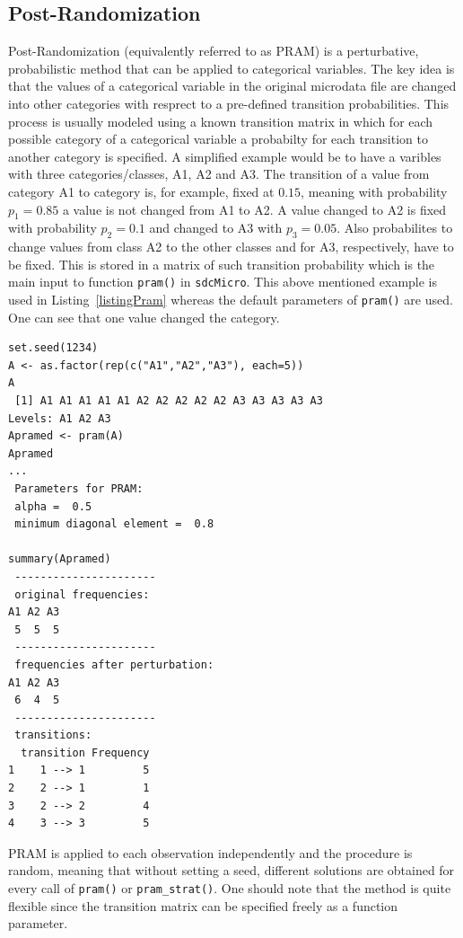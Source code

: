 \documentclass[12pt]{article}
\begin{document}
\subsection{Post-Randomization}\label{method:pram}
Post-Randomization (equivalently referred to as PRAM) \citep{Gouweleeuw98} is a perturbative, 
probabilistic method that can be applied to categorical variables. 
The key idea is that the values of a categorical variable 
in the original microdata file are changed into other categories with resprect to a pre-defined transition probabilities.
This process is usually modeled using a known transition matrix 
in which for each possible category of a categorical variable a probabilty for each transition to another category
 is specified. %
A simplified example would be to have a varibles with three categories/classes, A1, A2 and A3. 
The transition of 
a value from category A1 to category is, for example, fixed at $0.15$, meaning with
 probability $p_1=0.85$ a value is not changed from A1 to A2.
A value changed to A2 is fixed with probability $p_2=0.1$ and 
changed to A3 with $p_3=0.05$. 
Also probabilites to change values from class A2 to the other classes and for A3, respectively, have to be fixed.
This is stored in 
a matrix of such transition probability which is the main input to function \lstinline{pram()} in \texttt{sdcMicro}.
This above mentioned example is used in Listing~\ref{listingPram} whereas the default parameters of \lstinline{pram()} are used.
One can see that one value changed the category.
\begin{lstlisting}[captionpos=b, caption={Example for pram.}, label=listingPram]
set.seed(1234)
A <- as.factor(rep(c("A1","A2","A3"), each=5))
A
 [1] A1 A1 A1 A1 A1 A2 A2 A2 A2 A2 A3 A3 A3 A3 A3
Levels: A1 A2 A3
Apramed <- pram(A)
Apramed
...
 Parameters for PRAM: 
 alpha =  0.5
 minimum diagonal element =  0.8 
 
summary(Apramed)
 ----------------------
 original frequencies:
A1 A2 A3 
 5  5  5 
 ----------------------
 frequencies after perturbation:
A1 A2 A3 
 6  4  5 
 ----------------------
 transitions:
  transition Frequency
1    1 --> 1         5
2    2 --> 1         1
3    2 --> 2         4
4    3 --> 3         5
\end{lstlisting}


PRAM is applied to each observation independently and the procedure is random, meaning that 
without setting a seed, different solutions are obtained for every call of \lstinline{pram()} or \lstinline{pram_strat()}.%
 One should note that the method is quite flexible since the transition matrix can be specified freely as a function parameter. \\
\end{document}
